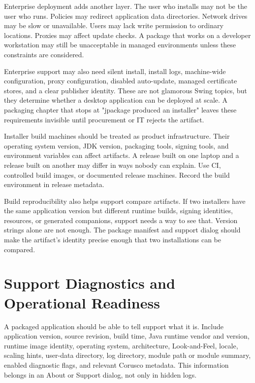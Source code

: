 Enterprise deployment adds another layer. The user who installs may not be the user who runs. Policies may redirect application data directories. Network drives may be slow or unavailable. Users may lack write permission to ordinary locations. Proxies may affect update checks. A package that works on a developer workstation may still be unacceptable in managed environments unless these constraints are considered.

Enterprise support may also need silent install, install logs, machine-wide configuration, proxy configuration, disabled auto-update, managed certificate stores, and a clear publisher identity. These are not glamorous Swing topics, but they determine whether a desktop application can be deployed at scale. A packaging chapter that stops at "jpackage produced an installer" leaves these requirements invisible until procurement or IT rejects the artifact.

Installer build machines should be treated as product infrastructure. Their operating system version, JDK version, packaging tools, signing tools, and environment variables can affect artifacts. A release built on one laptop and a release built on another may differ in ways nobody can explain. Use CI, controlled build images, or documented release machines. Record the build environment in release metadata.

Build reproducibility also helps support compare artifacts. If two installers have the same application version but different runtime builds, signing identities, resources, or generated companions, support needs a way to see that. Version strings alone are not enough. The package manifest and support dialog should make the artifact's identity precise enough that two installations can be compared.

\section{Support Diagnostics and Operational Readiness}

A packaged application should be able to tell support what it is. Include application version, source revision, build time, Java runtime vendor and version, runtime image identity, operating system, architecture, Look-and-Feel, locale, scaling hints, user-data directory, log directory, module path or module summary, enabled diagnostic flags, and relevant Corusco metadata. This information belongs in an About or Support dialog, not only in hidden logs.

